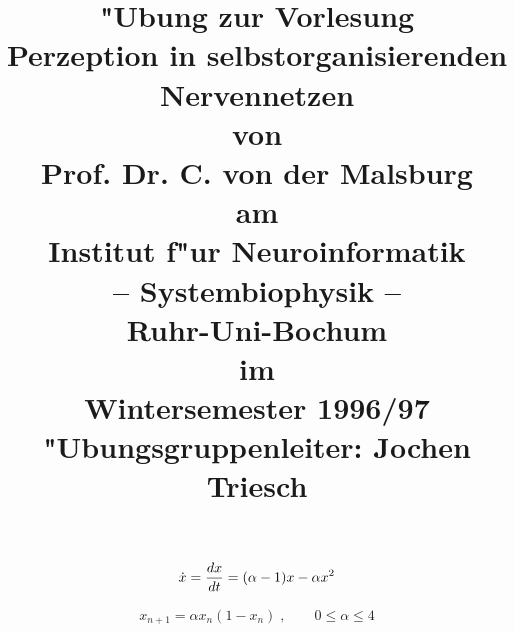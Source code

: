 \documentclass{article}
\title{
    {\huge 
    "Ubung zur Vorlesung}\\ 
     \vspace{1.5cm}
    {\sc \Huge 
    Perzeption in selbstorganisierenden Nervennetzen}\\ 
     \vspace{1.5cm}
    {\LARGE
    von \\ 
    Prof. Dr. C. von der Malsburg\\ 
     \vspace{0.5cm}
    am\\     
    Institut f"ur Neuroinformatik\\ 
    -- Systembiophysik --\\ 
    Ruhr-Uni-Bochum\\ 
     \vspace{0.5cm}
    im\\ 
    Wintersemester 1996/97\\ 
     \vspace{2cm}
    "Ubungsgruppenleiter: Jochen Triesch
    }
}
\author{}
\date{}
\begin{document}
\pagestyle{empty}
\setcounter{section}{1}
\setcounter{equation}{0}
\setcounter{subsection}{0}
{\newpage
\clearpage
\samepage %
\thesection
}

{\newpage
\clearpage
\samepage \begin{eqnarray}\label{eqnLogDGL}
  \dot{x} = {dx \over dt} = (\alpha - 1) x - \alpha x^2
\end{eqnarray}
}

{\newpage
\clearpage
\samepage \begin{eqnarray}\label{eqnLogDiffGl}
  x_{n+1} = \alpha x_n (1 - x_n)\;, \qquad 0 \leq \alpha \leq 4
\end{eqnarray}
}
\end{document}
